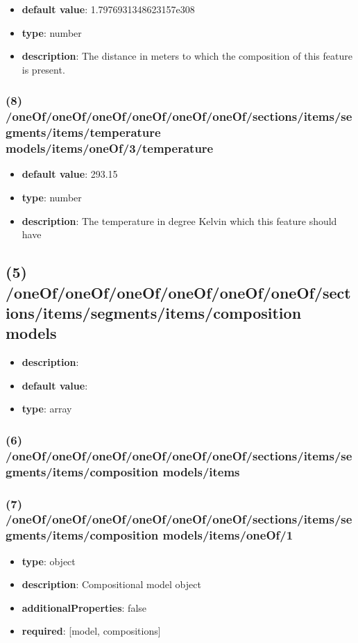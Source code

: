 \begin{itemize}[leftmargin=8em]\item {\bf default value}: 1.7976931348623157e308
\item {\bf type}: number
\item {\bf description}: The distance in meters to which the composition of this feature is present.
\end{itemize}\subsubsection{(8) /oneOf/oneOf/oneOf/oneOf/oneOf/oneOf/sections/items/segments/items/temperature models/items/oneOf/3/temperature}
\begin{itemize}[leftmargin=8em]\item {\bf default value}: 293.15
\item {\bf type}: number
\item {\bf description}: The temperature in degree Kelvin which this feature should have
\end{itemize}\subsection{(5) /oneOf/oneOf/oneOf/oneOf/oneOf/oneOf/sections/items/segments/items/composition models}
\begin{itemize}[leftmargin=5em]\item {\bf description}: 
\item {\bf default value}: 
\item {\bf type}: array
\end{itemize}\subsubsection{(6) /oneOf/oneOf/oneOf/oneOf/oneOf/oneOf/sections/items/segments/items/composition models/items}

\subsubsection{(7) /oneOf/oneOf/oneOf/oneOf/oneOf/oneOf/sections/items/segments/items/composition models/items/oneOf/1}
\begin{itemize}[leftmargin=7em]\item {\bf type}: object
\item {\bf description}: Compositional model object
\item {\bf additionalProperties}: false
\item {\bf required}: [model, compositions]\end{itemize}

